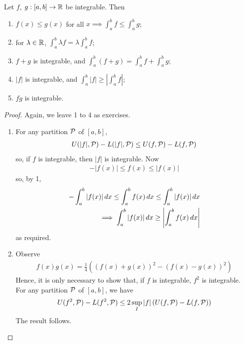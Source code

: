 \documentclass{../template/note}
\begin{document}
    \begin{lemma}
        Let \(f\), \(g: [a, b] \to \mathbb R\) be integrable. Then
        \begin{enumerate}
            \item \(f(x) \leq g(x)\) for all \(x \implies \int_a^b f \leq \int_a^b g\);
            \item[2, 3.] for \(\lambda \in \mathbb R\), \(\int_a^b \lambda f = \lambda \int_a^b f\);
            \item[4] \(f+g\) is integrable, and \(\int_a^b (f+g) = \int_a^b f + \int_a^b g\);
            \item[5] \(|f|\) is integrable, and \(\int_a^b |f| \geq \left|\int_a^b f\right|\);
            \item[6] \(fg\) is integrable.
        \end{enumerate}
    \end{lemma}
    
    \begin{proof}
        Again, we leave 1 to 4 as exercises.
        \begin{enumerate}
            \item[5.] For any partition \(\mathcal{P}\) of \([a, b]\),
            \begin{align*}
                U(|f|, \mathcal{P}) - L(|f|, \mathcal{P}) \leq U(f, \mathcal{P}) - L(f, \mathcal{P})
            \end{align*}
            so, if \(f\) is integrable, then \(|f|\) is integrable. Now
            \begin{align*}
                -|f(x)| \leq f(x) \leq |f(x)|
            \end{align*}
            so, by 1,
            \begin{align*}
                -\int_a^b |f(x)| \,d{x} \leq \int_a^b f(x) \,d{x} \leq \int_a^b |f(x)| \,d{x} \\
                \implies \int_a^b |f(x)| \,d{x} \geq \left|\int_a^b f(x) \,d{x}\right|
            \end{align*}
            as required.
            \item[6.] Observe
            \begin{align*}
                f(x)g(x) = \frac 1 4 \left((f(x)+g(x))^2-(f(x)-g(x))^2\right)
            \end{align*}
            Hence, it is only necessary to show that, if \(f\) is integrable, \(f^2\) is integrable. For any partition \(\mathcal{P}\) of \([a, b]\), we have
            \begin{align*}
                U(f^2, \mathcal{P}) - L(f^2, \mathcal{P}) \leq 2 \sup_I |f| \left(U(f, \mathcal{P}) - L(f, \mathcal{P})\right)
            \end{align*}
            The result follows.
        \end{enumerate}
    \end{proof}
    
\end{document}
